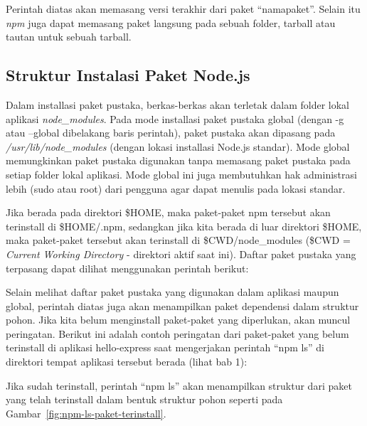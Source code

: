 \lstset{language=bash,caption=Cara install paket menggunakan npm}


Perintah diatas akan memasang versi terakhir dari paket ``namapaket''. Selain itu \textit{npm} juga dapat memasang paket langsung pada sebuah folder, tarball atau tautan untuk sebuah tarball.

\subsection{Struktur Instalasi Paket Node.js}

Dalam installasi paket pustaka, berkas-berkas akan terletak dalam folder lokal aplikasi \textit{node\_modules}. Pada mode installasi paket pustaka global (dengan -g atau --global dibelakang baris perintah), paket pustaka akan dipasang pada \textit{/usr/lib/node\_modules} (dengan lokasi installasi Node.js standar). Mode global memungkinkan paket pustaka digunakan tanpa memasang paket pustaka pada setiap folder lokal aplikasi. Mode global ini juga membutuhkan hak administrasi lebih (sudo atau root) dari pengguna agar dapat menulis pada lokasi standar. 

Jika berada pada direktori \$HOME, maka paket-paket npm tersebut akan terinstall di \$HOME/.npm, sedangkan jika kita berada di luar direktori \$HOME, maka paket-paket tersebut akan terinstall di \$CWD/node\_modules (\$CWD = \textit{Current Working Directory} - direktori aktif saat ini). Daftar paket pustaka yang terpasang dapat dilihat menggunakan perintah berikut:

\lstset{language=bash,caption=Argumen npm untuk melihat daftar paket terpasang}


Selain melihat daftar paket pustaka yang digunakan dalam aplikasi maupun global, perintah diatas juga akan menampilkan paket dependensi dalam struktur pohon. Jika kita belum menginstall paket-paket yang diperlukan, akan muncul peringatan. Berikut ini adalah contoh peringatan dari paket-paket yang belum terinstall di aplikasi hello-express saat mengerjakan perintah ``npm ls'' di direktori tempat aplikasi tersebut berada (lihat bab 1):

\lstset{language=bash,caption=npm ls pada aplikasi yang paket-paketnya belum terinstall}


Jika sudah terinstall, perintah ``npm ls'' akan menampilkan struktur dari paket yang telah terinstall dalam bentuk struktur pohon seperti pada Gambar~\ref{fig:npm-ls-paket-terinstall}.

